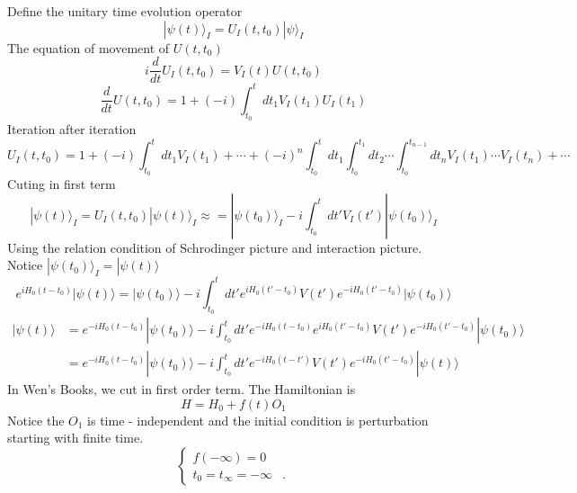 \documentclass[a4paper,11pt]{article}
\begin{document}
Define the unitary time evolution operator
\begin{equation*}
  |\psi(t)\rangle_I=U_I(t,t_0)|\psi\rangle_I
\end{equation*}
The equation of movement of $U(t,t_0)$
\begin{equation*}
  i\frac{d}{dt}U_I(t,t_0)=V_I(t)U(t,t_0)
\end{equation*}
\begin{equation*}
  \frac{d}{dt}U(t,t_0)=1+(-i)\int_{t_0}^{t}dt_1V_I(t_1)U_I(t_1)
\end{equation*}
Iteration after iteration
\begin{equation*}
  U_I(t,t_0)=1+(-i)\int_{t_0}^{t}dt_1V_I(t_1)+\cdots+(-i)^n\int_{t_0}^{t}dt_1\int_{t_0}^{t_1}dt_2\cdots\int_{t_0}^{t_{n-1}}dt_nV_I(t_1)\cdots V_I(t_n)+\cdots
\end{equation*}
Cuting in first term
\begin{equation*}
  |\psi(t)\rangle_I=U_I(t,t_0)|\psi(t)\rangle_I\approx=|\psi(t_0)\rangle_I-i\int_{t_0}^{t}dt'V_I(t')|\psi(t_0)\rangle_I
\end{equation*}
Using the relation condition of Schrodinger picture and interaction picture. Notice $|\psi(t_0)\rangle_I=|\psi(t)\rangle$
\begin{equation*}
  e^{iH_0(t-t_0)}|\psi(t)\rangle=|\psi(t_0)\rangle-i\int_{t_0}^{t}dt'e^{iH_0(t'-t_0)}V(t')e^{-iH_0(t'-t_0)}|\psi(t_0)\rangle
\end{equation*}
\begin{equation*}
  \begin{split}
     |\psi(t)\rangle&=e^{-iH_0(t-t_0)}|\psi(t_0)\rangle-i\int_{t_0}^{t}dt'e^{-iH_0(t-t_0)}e^{iH_0(t'-t_0)}V(t')e^{-iH_0(t'-t_0)}|\psi(t_0)\rangle\\
       &=e^{-iH_0(t-t_0)}|\psi(t_0)\rangle-i\int_{t_0}^{t}dt'e^{-iH_0(t-t')}V(t')e^{-iH_0(t'-t_0)}|\psi(t)\rangle
  \end{split}
\end{equation*}
In Wen's Books, we cut in first order term. The Hamiltonian is
\begin{equation*}
  H=H_0+f(t)O_1
\end{equation*}
Notice the $O_1$ is time - independent and the initial condition is perturbation starting with finite time.
\begin{equation*}
  \begin{cases}
  f(-\infty)=0&\\
  t_0=t_\infty=-\infty&.
  \end{cases}
\end{equation*}
\end{document}
